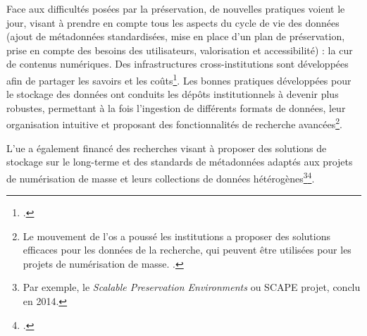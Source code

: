 Face aux difficultés posées par la préservation, de nouvelles pratiques voient le jour, visant à prendre en compte tous les aspects du cycle de vie des données (ajout de métadonnées standardisées, mise en place d'un plan de préservation, prise en compte des besoins des utilisateurs, valorisation et accessibilité) : la \gls{cur} de contenus numériques. Des infrastructures cross-institutions sont développées afin de partager les savoirs et les coûts\footcite{shankar_sustaining_2015}. Les bonnes pratiques développées pour le stockage des données ont conduits les dépôts institutionnels à devenir plus robustes, permettant à la fois l'ingestion de différents formats de données, leur organisation intuitive et proposant des fonctionnalités de recherche avancées\footnote{Le mouvement de l'\gls{os} a poussé les institutions a proposer des solutions efficaces pour les données de la recherche, qui peuvent être utilisées pour les projets de numérisation de masse. \cite{kowalczyk_digital_2018}.}. 

L'\gls{ue} a également financé des recherches visant à proposer des solutions de stockage sur le long-terme et des standards de métadonnées adaptés aux projets de numérisation de masse et leurs collections de données hétérogènes\footnote{Par exemple, le \textit{Scalable Preservation Environments} ou SCAPE projet, conclu en 2014.}\footcite{jurik_bridging_2015}.
\newpage
